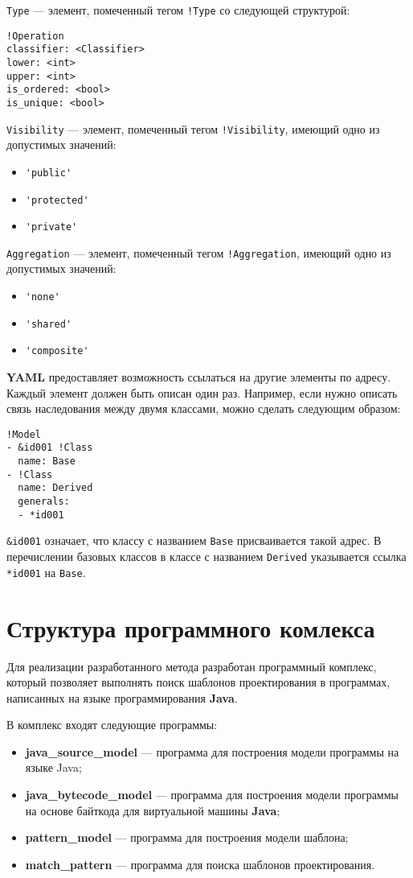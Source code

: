 \verb;Type; --- элемент, помеченный тегом \verb;!Type; со следующей
структурой:
\begin{verbatim}
!Operation
classifier: <Classifier>
lower: <int>
upper: <int>
is_ordered: <bool>
is_unique: <bool>
\end{verbatim}

\verb;Visibility; --- элемент, помеченный тегом \verb;!Visibility;,
имеющий одно из допустимых значений:
\begin{itemize}
\item \verb;'public';
\item \verb;'protected';
\item \verb;'private';
\end{itemize}

\verb;Aggregation; --- элемент, помеченный тегом \verb;!Aggregation;,
имеющий одно из допустимых значений:
\begin{itemize}
\item \verb;'none';
\item \verb;'shared';
\item \verb;'composite';
\end{itemize}

\textbf{YAML} предоставляет возможность ссылаться на другие элементы по адресу.
Каждый элемент должен быть описан один раз.
Например, если нужно описать связь наследования между двумя классами, можно
сделать следующим образом:
\begin{verbatim}
!Model
- &id001 !Class
  name: Base
- !Class
  name: Derived
  generals:
  - *id001
\end{verbatim}

\verb;&id001; означает, что классу с названием \verb;Base; присваивается такой
адрес. В перечислении базовых классов в классе с названием \verb;Derived;
указывается ссылка \verb;*id001; на \verb;Base;.

\section{Структура программного комлекса}

Для реализации разработанного метода разработан программный комплекс,
который позволяет выполнять поиск шаблонов проектирования в программах,
написанных на языке программирования \textbf{Java}.

В комплекс входят следующие программы:
\begin{itemize}
\item \textbf{java\_source\_model} --- программа для построения модели программы
на языке Java;
\item \textbf{java\_bytecode\_model} --- программа для построения модели программы
на основе байткода для виртуальной машины \textbf{Java};
\item \textbf{pattern\_model} --- программа для построения модели шаблона;
\item \textbf{match\_pattern} --- программа для поиска шаблонов проектирования.
\end{itemize}

